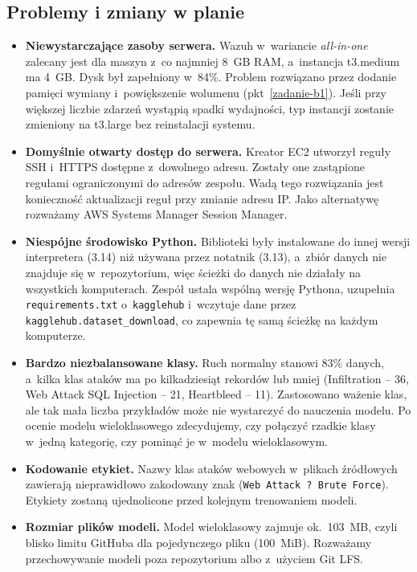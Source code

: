 \documentclass[11pt,a4paper,oneside]{article}
\newif\ifpodpowiedzi
\newcommand{\podpowiedz}[1]{\ifpodpowiedzi\par\begingroup\small\color{hintcolor}\textit{Wskazówka: #1}\par\endgroup\fi}
\begin{document}
\subsection{Problemy i zmiany w planie}
\podpowiedz{Wskaż trudności, przyczyny opóźnień, wpływ na harmonogram oraz podjęte lub proponowane działania. Odnotuj istotne zmiany zakresu uzgodnione z prowadzącymi. Jeśli nie wystąpiły problemy ani zmiany, napisz to wprost.}
\begin{itemize}
\item \textbf{Niewystarczające zasoby serwera.} Wazuh w~wariancie \textit{all-in-one} zalecany jest dla maszyn z~co najmniej 8~GB RAM, a~instancja t3.medium ma 4~GB. Dysk był zapełniony w~84\%. Problem rozwiązano przez dodanie pamięci wymiany i~powiększenie wolumenu (pkt~\ref{zadanie-b1}). Jeśli przy większej liczbie zdarzeń wystąpią spadki wydajności, typ instancji zostanie zmieniony na t3.large bez reinstalacji systemu.
\item \textbf{Domyślnie otwarty dostęp do serwera.} Kreator EC2 utworzył reguły SSH i~HTTPS dostępne z~dowolnego adresu. Zostały one zastąpione regułami ograniczonymi do adresów zespołu. Wadą tego rozwiązania jest konieczność aktualizacji reguł przy zmianie adresu IP. Jako alternatywę rozważamy AWS Systems Manager Session Manager.
\item \textbf{Niespójne środowisko Python.} Biblioteki były instalowane do innej wersji interpretera (3.14) niż używana przez notatnik (3.13), a~zbiór danych nie znajduje się w~repozytorium, więc ścieżki do danych nie działały na wszystkich komputerach. Zespół ustala wspólną wersję Pythona, uzupełnia \nolinkurl{requirements.txt} o~\texttt{kagglehub} i~wczytuje dane przez \texttt{kagglehub.dataset\_download}, co zapewnia tę samą ścieżkę na każdym komputerze.
\item \textbf{Bardzo niezbalansowane klasy.} Ruch normalny stanowi 83\% danych, a~kilka klas ataków ma po kilkadziesiąt rekordów lub mniej (Infiltration -- 36, Web Attack SQL Injection -- 21, Heartbleed -- 11). Zastosowano ważenie klas, ale tak mała liczba przykładów może nie wystarczyć do nauczenia modelu. Po ocenie modelu wieloklasowego zdecydujemy, czy połączyć rzadkie klasy w~jedną kategorię, czy pominąć je w~modelu wieloklasowym.
\item \textbf{Kodowanie etykiet.} Nazwy klas ataków webowych w~plikach źródłowych zawierają nieprawidłowo zakodowany znak (\texttt{Web Attack ? Brute Force}). Etykiety zostaną ujednolicone przed kolejnym trenowaniem modeli.
\item \textbf{Rozmiar plików modeli.} Model wieloklasowy zajmuje ok.~103~MB, czyli blisko limitu GitHuba dla pojedynczego pliku (100~MiB). Rozważamy przechowywanie modeli poza repozytorium albo z~użyciem Git LFS.

\end{itemize}
\end{document}
